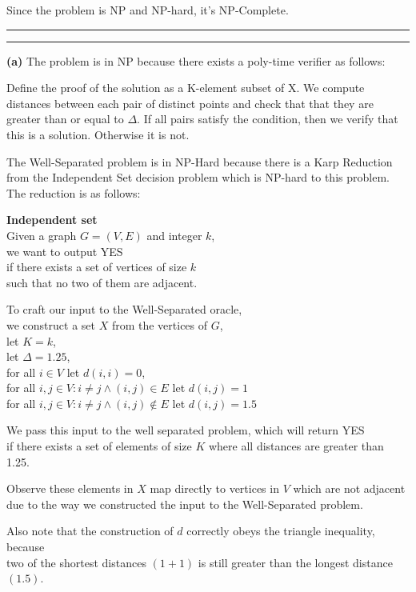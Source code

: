 \documentclass[11pt]{article}
\newcommand{\question}[2] {\vspace{.25in} \hrule\vspace{0.5em}
\noindent{\bf #1: #2} \vspace{0.5em}
\hrule \vspace{.10in}}
\renewcommand{\part}[1] {\vspace{.10in} {\bf (#1)}}
\begin{document}
Since the problem is NP and NP-hard, it's NP-Complete.

\question{3}{A Well-Separated Problem}
\part{a}
The problem is in NP because there exists a poly-time verifier as follows:

Define the proof of the solution as a K-element subset of X. We compute distances
between each pair of distinct points and check that that they are greater than or equal to $\Delta$.
If all pairs satisfy the condition, then we verify that this is a solution. Otherwise it is not.

The Well-Separated problem is in NP-Hard because there is a Karp Reduction from the Independent Set decision problem which is NP-hard to this problem.
The reduction is as follows:

\textbf{Independent set}\\
Given a graph $G = (V,E)$ and integer $k$,\\
we want to output YES\\
if there exists a set of vertices of size $k$\\
such that no two of them are adjacent.

To craft our input to the Well-Separated oracle,\\
we construct a set $X$ from the vertices of $G$,\\
let $K = k$,\\
let $\Delta = 1.25$,\\
for all $i \in V$ let $d(i,i) = 0$,\\
for all $i,j \in V : i \neq j \wedge (i,j) \in E$ let $d(i,j) = 1$\\
for all $i,j \in V : i \neq j \wedge (i,j) \notin E$ let $d(i,j) = 1.5$

We pass this input to the well separated problem, which will return YES\\
if there exists a set of elements of size $K$ where all distances are greater than 1.25.

Observe these elements in $X$ map directly to vertices in $V$ which are not adjacent\\
due to the way we constructed the input to the Well-Separated problem.

Also note that the construction of $d$ correctly obeys the triangle inequality, because\\
two of the shortest distances $(1 + 1)$ is still greater than the longest distance $(1.5)$.
\end{document}
